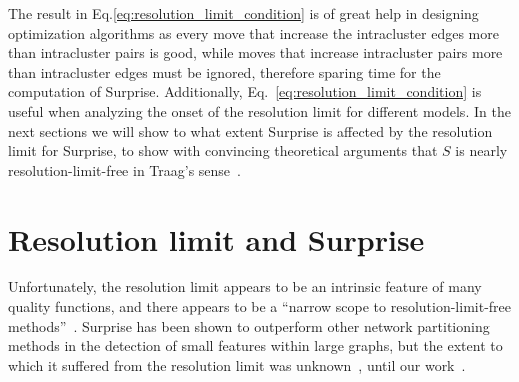 
The result in Eq.\ref{eq:resolution_limit_condition} is of great help in designing optimization algorithms as every move that increase the intracluster edges more than intracluster pairs is good, while moves that increase intracluster pairs more than intracluster edges must be ignored, therefore sparing time for the computation of Surprise. Additionally, Eq.~\ref{eq:resolution_limit_condition} is useful when analyzing the onset of the resolution limit for different models.
In the next sections we will show to what extent Surprise is affected by the resolution limit for Surprise, to show with convincing theoretical arguments that $S$ is nearly resolution-limit-free in Traag's sense~\cite{traag2015}.


\section{Resolution limit and Surprise}
Unfortunately, the resolution limit appears to be an intrinsic feature of many quality functions, and there appears to be a ``narrow scope to resolution-limit-free methods''~\cite{traag2015}.  
Surprise has been shown to outperform other network partitioning methods in the detection of small features within large graphs, but the extent to which it suffered from the resolution limit was unknown~\cite{aldecoa2011,aldecoa2013}, until our work~\cite{nicolini2016}.

